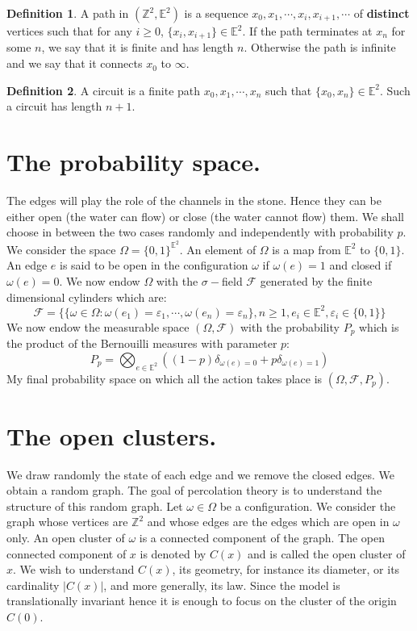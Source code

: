 \documentclass[10pt,a4paper]{book}
\theoremstyle{definition}
\newtheorem{definition}{Definition}[section]
\begin{document}
\begin{definition}
A path in $(\mathbb{Z}^2, \mathbb{E}^2)$ is a sequence $x_0, x_1, \cdots, x_i, x_{i+1}, \cdots$ of \textbf{distinct} vertices such that for any $i \geq 0$, $\{x_i, x_{i+1}\} \in \mathbb{E}^2$. If the path terminates at $x_n$ for some $n$, we say that it is finite and has length $n$. Otherwise the path is infinite and we say that it connects $x_0$ to $\infty$. 
\end{definition}

\begin{definition}
A circuit is a finite path $x_0, x_1, \cdots, x_n$ such that $\{x_0, x_n\} \in \mathbb{E}^2$. Such a circuit has length $n+1$. 
\end{definition}

\section{The probability space.}

The edges will play the role of the channels in the stone. Hence they can be either open (the water can flow) or close (the water cannot flow) them. We shall choose in between the two cases randomly and independently with probability $p$. We consider the space $\Omega = \{ 0, 1 \}^{\mathbb{E}^2}$. An element of $\Omega$ is a map from $\mathbb{E}^2$ to $\{0, 1\}$. An edge $e$ is said to be open in the configuration $\omega$ if $\omega(e) = 1$ and closed if $\omega(e) = 0$. We now endow $\Omega$ with the $\sigma-$field $\mathcal{F}$ generated by the finite dimensional cylinders which are:
\[
\mathcal{F} = \{ \{ \omega \in \Omega : \omega(e_1) = \varepsilon_1, \cdots, \omega(e_n) = \varepsilon_n \} , n\geq 1, e_i \in \mathbb{E}^2, \varepsilon_i \in \{0, 1\} \}
\]  
We now endow the measurable space $(\Omega, \mathcal{F})$ with the probability $P_p$ which is the product of the Bernouilli measures with parameter $p$:
\[
P_p = \bigotimes_{e \in \mathbb{E}^2} ((1 - p)\delta_{\omega(e) = 0} + p \delta_{\omega(e) = 1})
\]
My final probability space on which all the action takes place is $(\Omega, \mathcal{F}, P_p)$. 

\section{The open clusters.}

We draw randomly the state of each edge and we remove the closed edges. We obtain a random graph. The goal of percolation theory is to understand the structure of this random graph. Let $\omega \in \Omega$ be a configuration. We consider the graph whose vertices are $\mathbb{Z}^2$ and whose edges are the edges which are open in $\omega$ only. An open cluster of $\omega$ is a connected component of the graph. The open connected component of $x$ is denoted by $C(x)$ and is called the open cluster of $x$. We wish to understand $C(x)$, its geometry, for instance its diameter, or its cardinality $|C(x)|$, and more generally, its law. Since the model is translationally invariant hence it is enough to focus on the cluster  of the origin $C(0)$.
\end{document}
